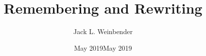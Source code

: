\documentclass[letterpaper,12pt,oneside]{memoir}
\begin{document}
\author{Jack L. Weinbender}
\date{May 2019}
\title{Remembering and Rewriting}
\date{May 2019}

\frontmatter
% 

\mainmatter


\nocite{*}
\backmatter
\begin{SingleSpace}
  \printbibliography[heading=bibintoc]
\end{SingleSpace}
\end{document}
